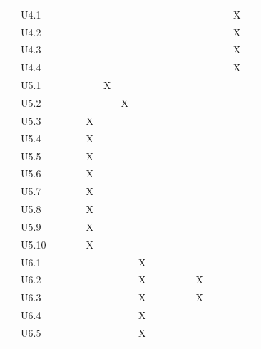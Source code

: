 \documentclass[hidelinks, 12pt, a4paper]{article}
\begin{document}
\begin{table}[H]
\begin{tabular}{|l|l|l|c|c|c|c|c|c|c|c|c|c|c|c|c|c|c|}
        & U4.1 &    &       &      &   &   &   &   &   &   &   &   &   &   &    & X \\ \cline{2-17}    
        & U4.2 &    &       &      &   &   &   &   &   &   &   &   &   &   &    & X \\ \cline{2-17}    
        & U4.3 &    &       &      &   &   &   &   &   &   &   &   &   &   &    & X \\ \cline{2-17}    
        & U4.4 &    &       &      &   &   &   &   &   &   &   &   &   &   &    & X \\ \cline{2-17}    
        & U5.1 &    &       &      &   & X  &   &   &   &   &   &   &   &   &    &  \\ \cline{2-17}    
        & U5.2 &    &       &      &   &   & X  &   &   &   &   &   &   &   &    &  \\ \cline{2-17}    
        & U5.3 &    &       &      & X  &   &   &   &   &   &   &   &   &   &    &  \\ \cline{2-17}    
        & U5.4 &    &       &      & X  &   &   &   &   &   &   &   &   &   &    &  \\ \cline{2-17}    
        & U5.5 &    &       &      & X  &   &   &   &   &   &   &   &   &   &    &  \\ \cline{2-17}    
        & U5.6 &    &       &      & X  &   &   &   &   &   &   &   &   &   &    &  \\ \cline{2-17}    
        & U5.7 &    &       &      & X  &   &   &   &   &   &   &   &   &   &    &  \\ \cline{2-17}    
        & U5.8 &    &       &      & X  &   &   &   &   &   &   &   &   &   &    &  \\ \cline{2-17}    
        & U5.9 &    &       &      & X  &   &   &   &   &   &   &   &   &   &    &  \\ \cline{2-17}    
        & U5.10 &   &       &      & X  &   &   &   &   &   &   &   &   &   &    &  \\ \cline{2-17}    
        & U6.1 &    &       &      &   &   &   &  X &   &   &   &   &   &   &    &  \\ \cline{2-17}    
        & U6.2 &    &       &      &   &   &   &  X &   &   &   &   & X &   &    &  \\ \cline{2-17}    
        & U6.3 &    &       &      &   &   &   &  X &   &   &   &   & X  &   &    &  \\ \cline{2-17}    
        & U6.4 &    &       &      &   &   &   &  X &   &   &   &   &   &   &    &  \\ \cline{2-17}    
        & U6.5 &    &       &      &   &   &   &  X &   &   &   &   &   &   &    &  \\ \cline{2-17}    

\end{tabular}
\end{table}
\end{document}
